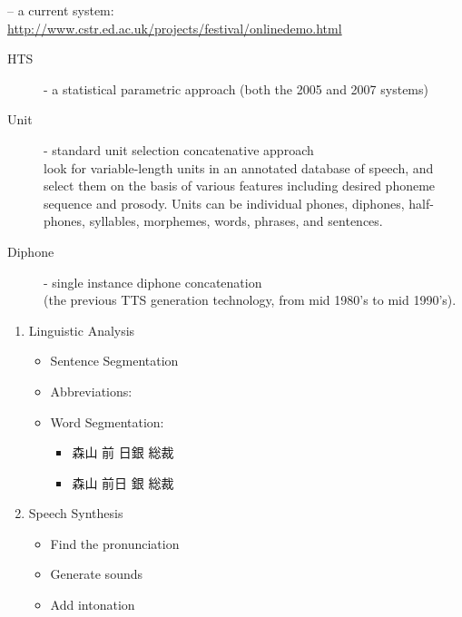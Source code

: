 \documentclass[a4paper,landscape,headrule,footrule,xetex]{foils}
\begin{document}
 -- a current  system:
\\ \url{http://www.cstr.ed.ac.uk/projects/festival/onlinedemo.html}

\begin{description}
\item [HTS] - a statistical parametric approach (both the 2005 and 2007 systems)
\item [Unit] - standard unit selection concatenative approach
\\ look for variable-length units in an
annotated database of speech, and select them on the basis of various
features including desired phoneme sequence and prosody.
Units can be individual phones, diphones, half-phones, syllables, morphemes, words, phrases, and sentences. 
\item [Diphone] - single instance diphone concatenation
\\      (the previous TTS generation technology, from mid 1980's to mid 1990's). 
\end{description}


\begin{enumerate}
\item Linguistic Analysis
  \begin{itemize}
  \item Sentence Segmentation
  \item Abbreviations: 
  \item Word Segmentation: 
    \begin{itemize}
    \item 森山 前 日銀 総裁 
    \item[\Bad]  森山 前日 銀 総裁　
      \end{itemize}
    \end{itemize}
\item Speech Synthesis
  \begin{itemize}
  \item Find the pronunciation
  \item Generate sounds
  \item Add intonation
  \end{itemize}
\end{enumerate}

\end{document}
